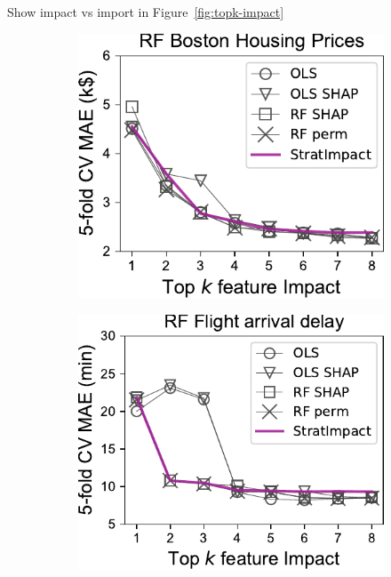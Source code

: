 \documentclass[twoside,11pt]{article}
\newcommand{\figref}[1]{Figure~\ref{#1}}
\begin{document}
Show impact vs import in \figref{fig:topk-impact}

\begin{figure}
\centering
\begin{subfigure}{.24\textwidth}
    \centering
\includegraphics[scale=0.48]{images/boston-topk-RF-Impact.pdf}
\end{subfigure}%
\hfill
\begin{subfigure}{.23\textwidth}
    \centering
\includegraphics[scale=0.48]{images/flights-topk-RF-Impact.pdf}
\end{subfigure}

\end{figure}
\end{document}
